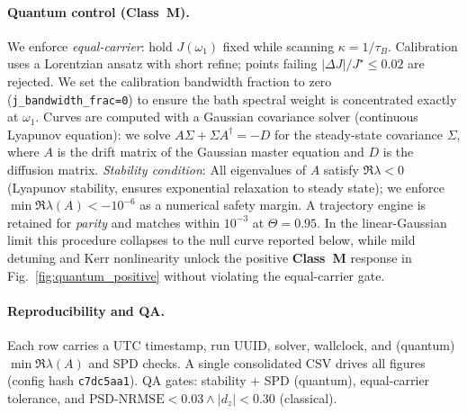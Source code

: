 \documentclass[11pt,letterpaper]{article}
\newcommand{\confighash}{c7dc5aa1}
\DeclareRobustCommand{\classM}{\textbf{Class~M}\xspace}
\DeclareRobustCommand{\GatePSD}{\ensuremath{\text{PSD-NRMSE}<0.03}\xspace}
\DeclareRobustCommand{\GateDZ}{\ensuremath{\lvert d_z\rvert<0.30}\xspace}
\DeclareRobustCommand{\GateEQ}{\ensuremath{\GatePSD \wedge \GateDZ}\xspace}
\begin{document}
\paragraph*{Quantum control (\classM).}
We enforce \emph{equal-carrier}: hold $J(\omega_1)$ fixed while scanning $\kappa=1/\tau_B$. Calibration uses a Lorentzian ansatz with short refine; points failing $|\Delta J|/J^\star\le 0.02$ are rejected. We set the calibration bandwidth fraction to zero (\texttt{j\_bandwidth\_frac=0}) to ensure the bath spectral weight is concentrated exactly at $\omega_1$. Curves are computed with a Gaussian covariance solver (continuous Lyapunov equation): we solve $A\Sigma + \Sigma A^\dagger = -D$ for the steady-state covariance $\Sigma$, where $A$ is the drift matrix of the Gaussian master equation and $D$ is the diffusion matrix. \emph{Stability condition}: All eigenvalues of $A$ satisfy $\Re\lambda < 0$ (Lyapunov stability, ensures exponential relaxation to steady state); we enforce $\min\Re\lambda(A) < -10^{-6}$ as a numerical safety margin. A trajectory engine is retained for \emph{parity} and matches within $10^{-3}$ at $\Theta=0.95$. In the linear-Gaussian limit this procedure collapses to the null curve reported below, while mild detuning and Kerr nonlinearity unlock the positive \classM{} response in Fig.~\ref{fig:quantum_positive} without violating the equal-carrier gate.

\paragraph*{Reproducibility and QA.}
Each row carries a UTC timestamp, run UUID, solver, wallclock, and (quantum) $\min \Re \lambda(A)$ and SPD checks. A single consolidated CSV drives all figures (config hash \texttt{\confighash}). QA gates: stability + SPD (quantum), equal-carrier tolerance, and \GateEQ{} (classical).
\end{document}
